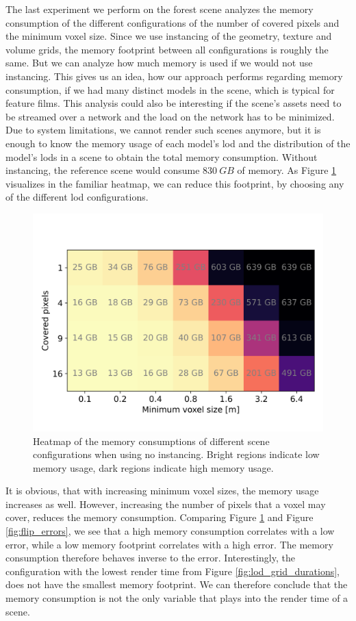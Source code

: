 The last experiment we perform on the forest scene analyzes the memory consumption of the different configurations of the number of covered pixels and the minimum voxel size.
Since we use instancing of the geometry, texture and volume grids, the memory footprint between all configurations is roughly the same.
But we can analyze how much memory is used if we would not use instancing.
This gives us an idea, how our approach performs regarding memory consumption, if we had many distinct models in the scene, which is typical for feature films.
This analysis could also be interesting if the scene's assets need to be streamed over a network and the load on the network has to be minimized.
Due to system limitations, we cannot render such scenes anymore, but it is enough to know the memory usage of each model's \ac{lod} and the distribution of the model's \acsp{lod} in a scene to obtain the total memory consumption.
Without instancing, the reference scene would consume $\SI{830}{GB}$ of memory.
As Figure \ref{fig:memory_usage} visualizes in the familiar heatmap, we can reduce this footprint, by choosing any of the different \ac{lod} configurations.
\begin{figure}[t]
    \centering
    \includegraphics[width=0.49\linewidth]{img/results/memory_usage.png}
    \caption[Visualization of the memory consumption of different scene configurations]{Heatmap of the memory consumptions of different scene configurations when using no instancing. Bright regions indicate low memory usage, dark regions indicate high memory usage.}
    \label{fig:memory_usage}
\end{figure}
It is obvious, that with increasing minimum voxel sizes, the memory usage increases as well.
However, increasing the number of pixels that a voxel may cover, reduces the memory consumption.
Comparing Figure \ref{fig:memory_usage} and Figure \ref{fig:flip_errors}, we see that a high memory consumption correlates with a low \FLIP error, while a low memory footprint correlates with a high \FLIP error.
The memory consumption therefore behaves inverse to the \FLIP error.
Interestingly, the configuration with the lowest render time from Figure \ref{fig:lod_grid_durations}, does not have the smallest memory footprint.
We can therefore conclude that the memory consumption is not the only variable that plays into the render time of a scene.

